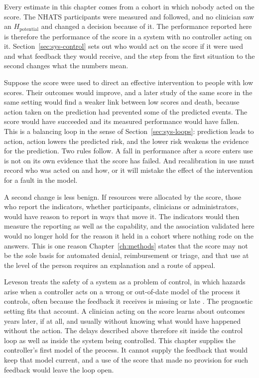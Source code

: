 Every estimate in this chapter comes from a cohort in which nobody acted on the score. The NHATS participants were measured and followed, and no clinician saw an $H_{\text{potential}}$ and changed a decision because of it. The performance reported here is therefore the performance of the score in a system with no controller acting on it. Section~\ref{sec:sys-control} sets out who would act on the score if it were used and what feedback they would receive, and the step from the first situation to the second changes what the numbers mean.

Suppose the score were used to direct an effective intervention to people with low scores. Their outcomes would improve, and a later study of the same score in the same setting would find a weaker link between low scores and death, because action taken on the prediction had prevented some of the predicted events. The score would have succeeded and its measured performance would have fallen. This is a balancing loop in the sense of Section~\ref{sec:sys-loops}: prediction leads to action, action lowers the predicted risk, and the lower risk weakens the evidence for the prediction. Two rules follow. A fall in performance after a score enters use is not on its own evidence that the score has failed. And recalibration in use must record who was acted on and how, or it will mistake the effect of the intervention for a fault in the model.

A second change is less benign. If resources were allocated by the score, those who report the indicators, whether participants, clinicians or administrators, would have reason to report in ways that move it. The indicators would then measure the reporting as well as the capability, and the association validated here would no longer hold for the reason it held in a cohort where nothing rode on the answers. This is one reason Chapter~\ref{ch:methods} states that the score may not be the sole basis for automated denial, reimbursement or triage, and that use at the level of the person requires an explanation and a route of appeal.

Leveson treats the safety of a system as a problem of control, in which hazards arise when a controller acts on a wrong or out-of-date model of the process it controls, often because the feedback it receives is missing or late \citep{leveson_2011}. The prognostic setting fits that account. A clinician acting on the score learns about outcomes years later, if at all, and usually without knowing what would have happened without the action. The delays described above therefore sit inside the control loop as well as inside the system being controlled. This chapter supplies the controller's first model of the process. It cannot supply the feedback that would keep that model current, and a use of the score that made no provision for such feedback would leave the loop open.

